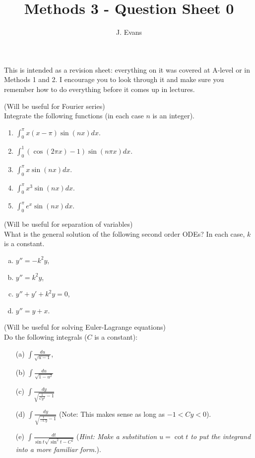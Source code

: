 \documentclass[12pt]{article}
\title{Methods 3 - Question Sheet 0}
\author{J. Evans}
\date{}
\begin{document}
\maketitle

This is intended as a revision sheet: everything on it was covered at A-level or in Methods 1 and 2. I encourage you to look through it and make sure you remember how to do everything before it comes up in lectures.

\begin{question}(Will be useful for Fourier series)\\
Integrate the following functions (in each case $n$ is an integer).
\begin{enumerate}
\item $\int_0^{\pi}x(x-\pi)\sin(nx)dx$.
\item $\int_0^1(\cos(2\pi x)-1)\sin(n\pi x)dx$.
\item $\int_0^{\pi}x\sin(nx)dx$.
\item $\int_0^{\pi}x^3\sin(nx)dx$.
\item $\int_0^{\pi}e^x\sin(nx)dx$.
\end{enumerate}
\end{question}

\bigskip

\begin{question}(Will be useful for separation of variables)\\
What is the general solution of the following second order ODEs? In each case, $k$ is a constant.
\begin{enumerate}[(a)]
\item $y''=-k^2y$,
\item $y''=k^2y$,
\item $y''+y'+k^2y=0$,
\item $y''=y+x$.
\end{enumerate}
\end{question}

\bigskip

\begin{question}(Will be useful for solving Euler-Lagrange equations)\\
Do the following integrals ($C$ is a constant):
\begin{enumerate}
\item[(a)] $\int\frac{du}{\sqrt{u-1}}$,
\item[(b)] $\int\frac{du}{\sqrt{1-u^2}}$
\item[(c)] $\int\frac{dy}{\sqrt{\frac{1}{Cy^2}-1}}$
\item[(d)] $\int\frac{dy}{\sqrt{\frac{1}{-Cy}-1}}$ (Note: This makes sense as long as $-1<Cy<0$).
\item[(e)] $\int\frac{dt}{\sin t\sqrt{\sin^2 t-C^2}}$ ({\em Hint: Make a substitution $u=\cot t$ to put the integrand into a more familiar form.}).
\end{enumerate}
\end{question}
\end{document}
